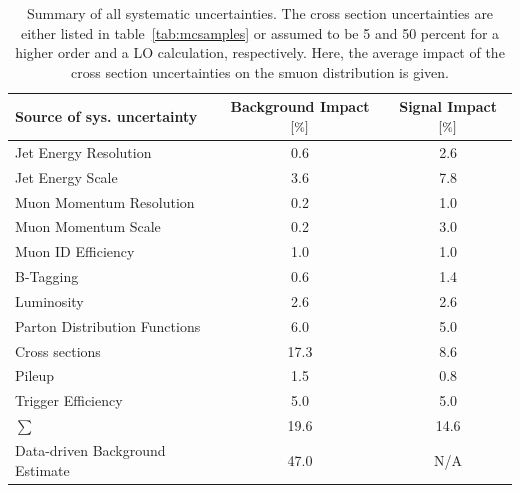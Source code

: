 \begin{table}[!htb]
  \centering
  \begin{tabular}{|l|c|c|}
    \hline
    Source of sys. uncertainty      & Background Impact $[\pct]$ & Signal Impact $[\pct]$ \\
    \hline
    \hline
    Jet Energy Resolution           & 0.6                        & 2.6                    \\
    Jet Energy Scale                & 3.6                        & 7.8                    \\
    Muon Momentum Resolution        & 0.2                        & 1.0                    \\
    Muon Momentum Scale             & 0.2                        & 3.0                    \\
    Muon ID Efficiency              & 1.0                        & 1.0                    \\
    B-Tagging                       & 0.6                        & 1.4                    \\
    \hline
    Luminosity                      & 2.6                        & 2.6                    \\
    Parton Distribution Functions   & 6.0                        & 5.0                    \\
    Cross sections                  & 17.3                       & 8.6                    \\
    Pileup                          & 1.5                        & 0.8                    \\
    Trigger Efficiency              & 5.0                        & 5.0                    \\
    \hline
    $\sum$                          & 19.6                       & 14.6                   \\
    \hline
    \hline
    Data-driven Background Estimate & 47.0                       & N/A                    \\
    \hline
  \end{tabular}
  \caption{Summary of all systematic uncertainties. The cross section uncertainties are either listed in table~\ref{tab:mcsamples} or assumed to be 5 and 50 percent for a higher order and a LO calculation, respectively. Here, the average impact of the cross section uncertainties on the smuon distribution is given.}
  \label{tab:sys-uncertainties}
\end{table}

